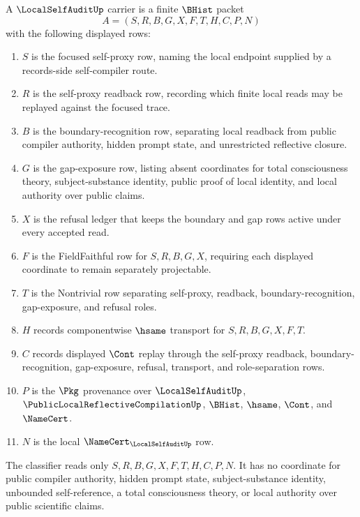 \begin{definition}
\label{def:local-self-audit-carrier}
A $\LocalSelfAuditUp$ carrier is a finite $\BHist$ packet
$$
A=(S,R,B,G,X,F,T,H,C,P,N)
$$
with the following displayed rows:
\begin{enumerate}
\item $S$ is the focused self-proxy row, naming the local endpoint supplied by a records-side self-compiler route.
\item $R$ is the self-proxy readback row, recording which finite local reads may be replayed against the focused trace.
\item $B$ is the boundary-recognition row, separating local readback from public compiler authority, hidden prompt state, and unrestricted reflective closure.
\item $G$ is the gap-exposure row, listing absent coordinates for total consciousness theory, subject-substance identity, public proof of local identity, and local authority over public claims.
\item $X$ is the refusal ledger that keeps the boundary and gap rows active under every accepted read.
\item $F$ is the FieldFaithful row for $S,R,B,G,X$, requiring each displayed coordinate to remain separately projectable.
\item $T$ is the Nontrivial row separating self-proxy, readback, boundary-recognition, gap-exposure, and refusal roles.
\item $H$ records componentwise $\hsame$ transport for $S,R,B,G,X,F,T$.
\item $C$ records displayed $\Cont$ replay through the self-proxy readback, boundary-recognition, gap-exposure, refusal, transport, and role-separation rows.
\item $P$ is the $\Pkg$ provenance over $\LocalSelfAuditUp$, $\PublicLocalReflectiveCompilationUp$, $\BHist$, $\hsame$, $\Cont$, and $\NameCert$.
\item $N$ is the local $\NameCert_{\LocalSelfAuditUp}$ row.
\end{enumerate}
The classifier reads only $S,R,B,G,X,F,T,H,C,P,N$. It has no coordinate for public compiler authority, hidden prompt state, subject-substance identity, unbounded self-reference, a total consciousness theory, or local authority over public scientific claims.
\end{definition}

